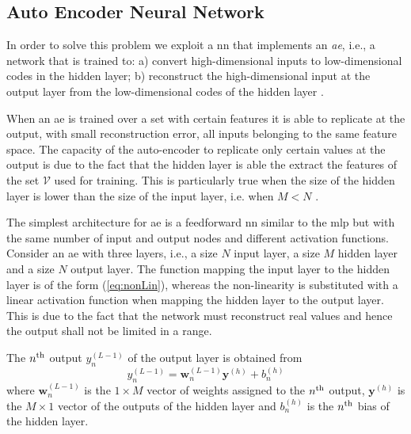 \documentclass[draftcls,onecolumn,12pt]{IEEEtran}
\begin{document}
\subsection{Auto Encoder Neural Network}
\label{sec:auto}

In order to solve this problem we exploit a \ac{nn} that implements an \textit{\ac{ae}}, i.e., a network that is trained to: a) convert high-dimensional inputs to low-dimensional codes in the hidden layer; b) reconstruct the high-dimensional input at the output layer from the low-dimensional codes of the hidden layer \cite{Hinton-2006}.

When an \ac{ae} is trained over a set with certain features it is able to replicate at the output, with small reconstruction error, all inputs belonging to the same feature space. The capacity of the auto-encoder to replicate only certain values at the output is due to the fact that the hidden layer is able the extract the features of the set $\mathcal{V}$ used for training. This is particularly true when the size of the hidden layer is lower than the size of the input layer, i.e. when $M<N$ \cite{Bourlard-88}.

The simplest architecture for \ac{ae} is a feedforward \ac{nn} similar to the \ac{mlp} but with the same number of input and output nodes and different activation functions. Consider an \ac{ae} with three layers, i.e., a size $N$ input layer, a size $M$ hidden layer and a size $N$ output layer.  The function mapping the input layer to the hidden layer is of the form (\ref{eq:nonLin}), whereas the non-linearity is substituted with a linear activation function when mapping the hidden layer to the output layer. This is due to the fact that the network must reconstruct real values and hence the output shall not be limited in a range. 

The $n^{\rm th}$ output $y_n^{(L-1)}$ of the output layer is obtained from
\begin{equation}
    y_n^{(L-1)}= \bm{w}_n^{(L-1)}\bm{y}^{(h)}+b_n^{(h)}
\end{equation}
where $\bm{w}_n^{(L-1)}$ is the $1\times M$ vector of weights assigned to the $n^{\rm th}$ output, $\bm{y}^{(h)}$ is the $M\times 1$ vector of the outputs of the hidden layer and $b_n^{(h)}$ is the $n^{\rm th}$ bias of the hidden layer.
\end{document}
